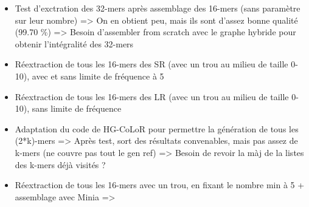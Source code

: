 \documentclass[12pt]{report}
\begin{document}
\begin{itemize}
	\item Test d'exctration des 32-mers après assemblage des 16-mers (sans paramètre sur leur nombre) => On
		  en obtient peu, mais ils sont d'assez bonne qualité (99.70 \%)
		  => Besoin d'assembler from scratch avec le graphe hybride pour obtenir l'intégralité des 32-mers
		  
	\item Réextraction de tous les 16-mers des SR (avec un trou au milieu de taille 0-10), avec et sans limite
		  de fréquence à 5
		  
	\item Réextraction de tous les 16-mers des LR (avec un trou au milieu de taille 0-10), sans limite
		  de fréquence		  
		  
	\item Adaptation du code de HG-CoLoR pour permettre la génération de tous les (2*k)-mers
			=> Après test, sort des résultats convenables, mais pas assez de k-mers (ne couvre pas tout le gen ref)
			=> Besoin de revoir la màj de la listes des k-mers déjà visités ?
			
	\item Réextraction de tous les 16-mers avec un trou, en fixant le nombre min à 5 + assemblage avec Minia
		  =>
\end{itemize}
\end{document}
